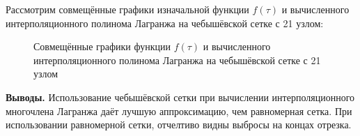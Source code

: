 \documentclass[14pt,a4paper]{scrartcl}
\begin{document}
Рассмотрим совмещённые графики изначальной функции $f(\tau)$ и вычисленного интерполяционного полинома Лагранжа на чебышёвской сетке с 21 узлом:
\begin{figure}[h]
	\caption{Совмещённые графики функции $f(\tau)$ и вычисленного интерполяционного полинома Лагранжа на чебышёвской сетке с 21 узлом}
\end{figure}


\textbf{Выводы.}
Использование чебышёвской сетки при вычислении интерполяционного многочлена Лагранжа даёт лучшую аппроксимацию, чем равномерная сетка. При использовании равномерной сетки, отчелтиво видны выбросы на концах отрезка. 
\end{document}
